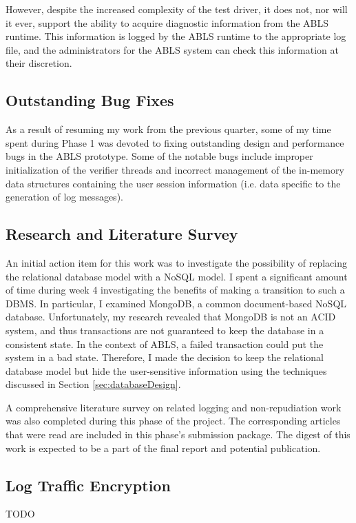 \documentclass{sig-alternate}
\begin{document}
However, despite the increased complexity of the test driver, it does not, nor will it ever, support the ability to acquire 
diagnostic information from the ABLS runtime. This information is logged by the ABLS runtime to the appropriate log 
file, and the administrators for the ABLS system can check this information at their discretion.


\subsection{Outstanding Bug Fixes}
As a result of resuming my work from the previous quarter, some of my time spent during Phase 1 was devoted to fixing
outstanding design and performance bugs in the ABLS prototype. Some of the notable bugs include improper 
initialization of the verifier threads and incorrect management of the in-memory data structures containing the 
user session information (i.e. data specific to the generation of log messages).

\subsection{Research and Literature Survey}
An initial action item for this work was to investigate the possibility of replacing the relational database model with a 
NoSQL model. I spent a significant amount of time during week 4 investigating the benefits of making a transition
to such a DBMS. In particular, I examined MongoDB, a common document-based NoSQL database. Unfortunately,
my research revealed that MongoDB is not an ACID system, and thus transactions are not guaranteed to keep the
database in a consistent state. In the context of ABLS, a failed transaction could put the system in a bad state. Therefore,
I made the decision to keep the relational database model but hide the user-sensitive information using the techniques
discussed in Section \ref{sec:databaseDesign}.

A comprehensive literature survey on related logging and non-repudiation work was also completed during this phase 
of the project. The corresponding articles that were read are included in this phase's submission package. The digest of this work is expected to be a part of the final report and potential publication.

\subsection{Log Traffic Encryption}
TODO
\end{document}
